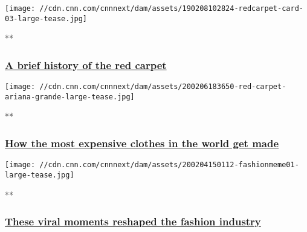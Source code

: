 \href{/videos/style/2019/02/07/history-of-red-carpet-style-origins.cnn/video/playlists/cnn-style/}{}

\texttt{[image: //cdn.cnn.com/cnnnext/dam/assets/190208102824-redcarpet-card-03-large-tease.jpg]}

**

\hypertarget{a-brief-history-of-the-red-carpet}{%
\subsubsection{\texorpdfstring{\href{/videos/style/2019/02/07/history-of-red-carpet-style-origins.cnn/video/playlists/cnn-style/}{A
brief history of the red
carpet}}{A brief history of the red carpet}}\label{a-brief-history-of-the-red-carpet}}

\href{/videos/fashion/2020/02/06/haute-couture-explainer-paris-high-fashion-red-carpet-orig.cnn/video/playlists/cnn-style/}{}

\texttt{[image: //cdn.cnn.com/cnnnext/dam/assets/200206183650-red-carpet-ariana-grande-large-tease.jpg]}

**

\hypertarget{how-the-most-expensive-clothes-in-the-world-get-made}{%
\subsubsection{\texorpdfstring{\href{/videos/fashion/2020/02/06/haute-couture-explainer-paris-high-fashion-red-carpet-orig.cnn/video/playlists/cnn-style/}{How
the most expensive clothes in the world get
made}}{How the most expensive clothes in the world get made}}\label{how-the-most-expensive-clothes-in-the-world-get-made}}

\href{/videos/fashion/2020/02/04/fashion-rihanna-met-gala-jlo-grammy-dress-meme-style-capital-orig.cnn/video/playlists/cnn-style/}{}

\texttt{[image: //cdn.cnn.com/cnnnext/dam/assets/200204150112-fashionmeme01-large-tease.jpg]}

**

\hypertarget{these-viral-moments-reshaped-the-fashion-industry}{%
\subsubsection{\texorpdfstring{\href{/videos/fashion/2020/02/04/fashion-rihanna-met-gala-jlo-grammy-dress-meme-style-capital-orig.cnn/video/playlists/cnn-style/}{These
viral moments reshaped the fashion
industry}}{These viral moments reshaped the fashion industry}}\label{these-viral-moments-reshaped-the-fashion-industry}}

